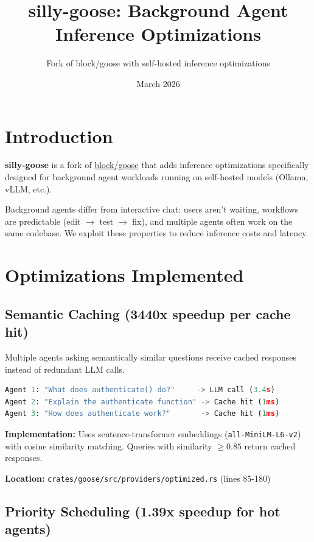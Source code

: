 \documentclass[11pt]{article}
\title{\textbf{silly-goose}: Background Agent Inference Optimizations}
\author{Fork of block/goose with self-hosted inference optimizations}
\date{March 2026}
\begin{document}
\maketitle

\section{Introduction}

\textbf{silly-goose} is a fork of \href{https://github.com/block/goose}{block/goose} that adds inference optimizations specifically designed for background agent workloads running on self-hosted models (Ollama, vLLM, etc.).

Background agents differ from interactive chat: users aren't waiting, workflows are predictable (edit $\rightarrow$ test $\rightarrow$ fix), and multiple agents often work on the same codebase. We exploit these properties to reduce inference costs and latency.

\section{Optimizations Implemented}

\subsection{Semantic Caching (3440x speedup per cache hit)}

Multiple agents asking semantically similar questions receive cached responses instead of redundant LLM calls.

\begin{lstlisting}[language=Python]
Agent 1: "What does authenticate() do?"     -> LLM call (3.4s)
Agent 2: "Explain the authenticate function" -> Cache hit (1ms)
Agent 3: "How does authenticate work?"       -> Cache hit (1ms)
\end{lstlisting}

\textbf{Implementation:} Uses sentence-transformer embeddings (\texttt{all-MiniLM-L6-v2}) with cosine similarity matching. Queries with similarity $\geq 0.85$ return cached responses.

\textbf{Location:} \texttt{crates/goose/src/providers/optimized.rs} (lines 85-180)

\subsection{Priority Scheduling (1.39x speedup for hot agents)}
\end{document}
